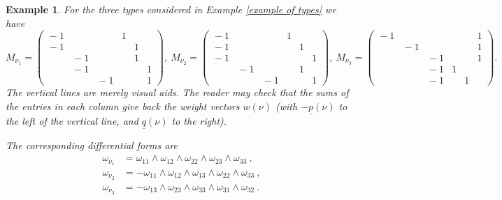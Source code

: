\documentclass[10pt]{amsart}
\newcommand{\pp}{{\underline{p}}}
\newcommand{\qq}{{\underline{q}}}
\theoremstyle{plain}
\newtheorem{ex}[thm]{Example}
\newcommand{\0}{\color{blue}{\mathsf{0}}}
\begin{document}
\begin{ex}\label{ex3M}
For the three types considered in Example \ref{example of types} we have
\[ 
M_{\nu_1} 
= \left(\begin{array}{ccc|ccc}  
\!\!-1  &  &   &\!1  & &   \\ 
\!\!-1  &  &   &  & 1 &   \\ 
  & \!\!\!\!-1 & &   &1  &   \\ 
  & \!\!\!\!-1 & &  & &1   \\ 
  &  & \!\!\!\!-1\!&  & & 1   
\end{array} \right)
, \ 
M_{\nu_2} 
= \left(\begin{array}{ccc|ccc}  
\!\!-1  &  &   &\!1  & &   \\ 
\!\!-1  &  &   &  & 1 &   \\ 
\!\!-1  &  & &   &  & 1   \\ 
  & \!\!\!\!-1 & &  & 1&    \\ 
  &   & \!\!\!\!-1\!&  & & 1   
\end{array} \right)
, \ 
M_{\nu_3} 
= \left(\begin{array}{ccc|ccc}  
\!\!-1  &  &   &  & & 1  \\ 
  & \!\!\!\!-1 &   &  &  & 1  \\ 
  &  & \!\!\!\!-1\!&   &  & 1   \\ 
  & & \!\!\!\!-1\!&\! 1 &  &    \\ 
  &  & \!\!\!\!-1\!&  & 1 &     
\end{array} \right).
\]
The vertical lines are merely visual aids.  The reader may check that the sums of the entries in each column give back the weight vectors $w(\nu)$ (with $-\pp(\nu)$ to the left of the vertical line, and $\qq(\nu)$ to the right).

The corresponding differential forms are 
\begin{align*}
\omega_{\nu_1}&=\omega_{11}\wedge\omega_{12}\wedge\omega_{22}\wedge\omega_{23}\wedge\omega_{33} \ ,\\
\omega_{\nu_2}&=-\omega_{11}\wedge\omega_{12}\wedge\omega_{13}\wedge\omega_{22}\wedge\omega_{33}  \ ,\\
\omega_{\nu_3}&=-\omega_{13}\wedge\omega_{23}\wedge\omega_{33}\wedge\omega_{31}\wedge\omega_{32}  \ .
\end{align*}

\end{ex}
\end{document}
